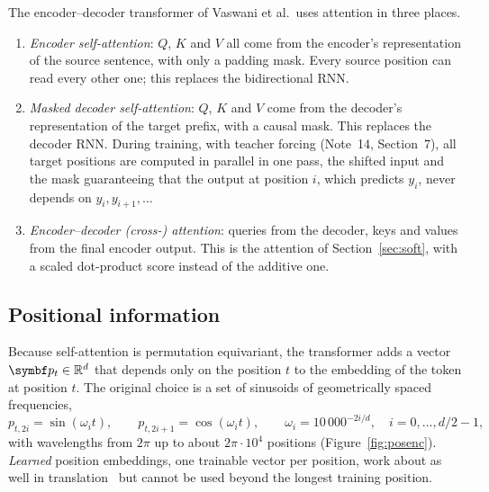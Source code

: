 \documentclass[11pt]{article}
\newcommand{\pv}{\vect{p}}
\begin{document}
The encoder--decoder transformer of Vaswani et al.\ uses attention in three places.
\begin{enumerate}
\item \emph{Encoder self-attention}: $Q$, $K$ and $V$ all come from the encoder's representation of the source sentence,
  with only a padding mask. Every source position can read every other one; this replaces the bidirectional RNN.
\item \emph{Masked decoder self-attention}: $Q$, $K$ and $V$ come from the decoder's representation of the target prefix,
  with a causal mask. This replaces the decoder RNN. During training, with teacher forcing (Note~14, Section~7), all target
  positions are computed in parallel in one pass, the shifted input and the mask guaranteeing that the output at position
  $i$, which predicts $y_i$, never depends on $y_i, y_{i+1}, \dots$
\item \emph{Encoder--decoder (cross-) attention}: queries from the decoder, keys and values from the final encoder output.
  This is the attention of Section~\ref{sec:soft}, with a scaled dot-product score instead of the additive one.
\end{enumerate}

\subsection{Positional information}\label{sec:posenc}

Because self-attention is permutation equivariant, the transformer adds a vector $\pv_t \in \R^d$ that depends only on the
position $t$ to the embedding of the token at position $t$. The original choice is a set of sinusoids of geometrically
spaced frequencies,
\begin{equation}\label{eq:posenc}
  p_{t,2i} = \sin(\omega_it), \qquad p_{t,2i+1} = \cos(\omega_it), \qquad \omega_i = 10\,000^{-2i/d}, \quad i = 0, \dots, d/2 - 1 ,
\end{equation}
with wavelengths from $2\pi$ up to about $2\pi \cdot 10^4$ positions (Figure~\ref{fig:posenc}). \emph{Learned} position
embeddings, one trainable vector per position, work about as well in translation~\cite{vaswani2017} but cannot be used beyond
the longest training position.
\end{document}
